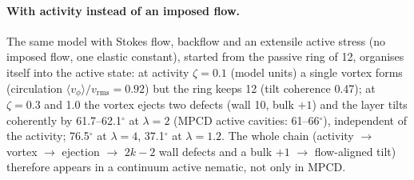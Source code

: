 \documentclass[11pt,a4paper]{article}
\begin{document}
\paragraph{With activity instead of an imposed flow.} The same model with Stokes flow, backflow and an extensile active stress (no imposed flow, one elastic constant),
started from the passive ring of 12, organises itself into the active state: at activity $\zeta=0.1$ (model units) a single vortex forms (circulation $\langle v_\phi\rangle/v_\mathrm{rms}=0.92$) but the ring keeps 12 (tilt coherence 0.47);
at $\zeta=0.3$ and 1.0 the vortex ejects two defects (wall 10, bulk $+1$) and the layer tilts coherently by 61.7--62.1$^\circ$ at $\lambda=2$ (MPCD active cavities: 61--66$^\circ$),
independent of the activity; 76.5$^\circ$ at $\lambda=4$, 37.1$^\circ$ at $\lambda=1.2$. The whole chain (activity $\to$ vortex $\to$ ejection $\to$ $2k-2$ wall defects and a bulk $+1$
$\to$ flow-aligned tilt) therefore appears in a continuum active nematic, not only in MPCD.
\end{document}
